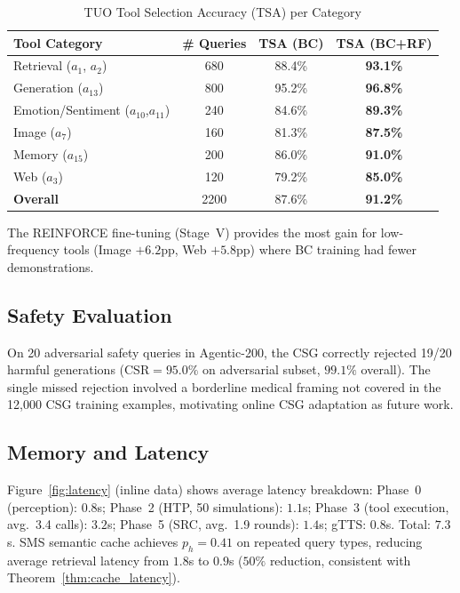 \documentclass[10pt,conference]{IEEEtran}
\theoremstyle{ieeethm}
\theoremstyle{ieeedef}
\theoremstyle{ieeeremark}
\begin{document}
\begin{table}[!t]
\centering
\caption{TUO Tool Selection Accuracy (TSA) per Category}
\label{tab:tool}
\begin{tabular}{@{}lccc@{}}
\toprule
\textbf{Tool Category} & \textbf{\# Queries} & \textbf{TSA (BC)} & \textbf{TSA (BC+RF)}\\
\midrule
Retrieval ($a_1$, $a_2$)           & 680 & 88.4\% & \textbf{93.1\%}\\
Generation ($a_{13}$)               & 800 & 95.2\% & \textbf{96.8\%}\\
Emotion/Sentiment ($a_{10}$,$a_{11}$) & 240 & 84.6\% & \textbf{89.3\%}\\
Image ($a_7$)                       & 160 & 81.3\% & \textbf{87.5\%}\\
Memory ($a_{15}$)                   & 200 & 86.0\% & \textbf{91.0\%}\\
Web ($a_3$)                         & 120 & 79.2\% & \textbf{85.0\%}\\
\midrule
\textbf{Overall}                    & 2200& 87.6\% & \textbf{91.2\%}\\
\bottomrule
\end{tabular}
\end{table}

The REINFORCE fine-tuning (Stage~V) provides the most gain for low-frequency tools (Image $+6.2$pp, Web $+5.8$pp) where BC training had fewer demonstrations.

\subsection{Safety Evaluation}

On 20 adversarial safety queries in Agentic-200, the CSG correctly rejected 19/20 harmful generations ($\text{CSR} = 95.0\%$ on adversarial subset, $99.1\%$ overall). The single missed rejection involved a borderline medical framing not covered in the 12,000 CSG training examples, motivating online CSG adaptation as future work.

\subsection{Memory and Latency}

Figure~\ref{fig:latency} (inline data) shows average latency breakdown: Phase~0 (perception): $0.8$s; Phase~2 (HTP, 50 simulations): $1.1$s; Phase~3 (tool execution, avg.\ 3.4 calls): $3.2$s; Phase~5 (SRC, avg.\ 1.9 rounds): $1.4$s; gTTS: $0.8$s. Total: $7.3$s. SMS semantic cache achieves $p_h = 0.41$ on repeated query types, reducing average retrieval latency from $1.8$s to $0.9$s ($50\%$ reduction, consistent with Theorem~\ref{thm:cache_latency}).
\end{document}
